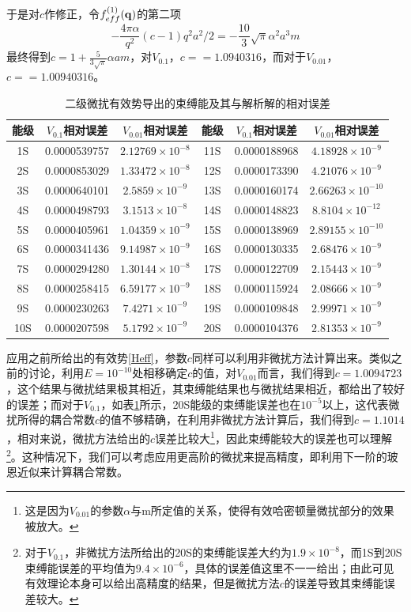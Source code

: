 \documentclass[cs4size,titlepage,twoside]{ctexart}
\begin{document}
于是对$c$作修正，令$f_{eff}^{(1)}(\vb{q})$的第二项
\begin{equation}
	-\frac{4\pi\alpha}{q^2}(c-1)q^2a^2/2=-\frac{10}{3} \sqrt{\pi } \alpha^2  a^3 m
\end{equation}
最终得到$\displaystyle c=1+\frac{5}{3\sqrt{\pi}}\alpha a m$，对$V_{0.1}$，$c==1.0940316$，而对于$V_{0.01}$，$c==1.00940316$。
\begin{table}[!htbp]
	\centering
	\begin{tabular}{|cccccc|}
		\hline
		能级 & $V_{0.1}$相对误差 & $V_{0.01}$相对误差 & 能级 & $V_{0.1}$相对误差 & $V_{0.01}$相对误差 \\\hline
		1S     & 0.0000539757 & $2.12769\times10^{-8}$ & 11S    & 0.0000188968 & $4.18928\times10^{-9}$  \\
		2S     & 0.0000853029 & $1.33472\times10^{-8}$ & 12S    & 0.0000173390 & $4.21076\times10^{-9}$  \\
		3S     & 0.0000640101 & $2.5859\times10^{-9}$  & 13S    & 0.0000160174 & $2.66263\times10^{-10}$ \\
		4S     & 0.0000498793 & $3.1513\times10^{-8}$  & 14S    & 0.0000148823 & $8.8104\times10^{-12}$  \\
		5S     & 0.0000405961 & $1.04359\times10^{-9}$ & 15S    & 0.0000138969 & $2.89155\times10^{-10}$ \\
		6S     & 0.0000341436 & $9.14987\times10^{-9}$ & 16S    & 0.0000130335 & $2.68476\times10^{-9}$  \\
		7S     & 0.0000294280 & $1.30144\times10^{-8}$ & 17S    & 0.0000122709 & $2.15443\times10^{-9}$  \\
		8S     & 0.0000258415 & $6.59177\times10^{-9}$ & 18S    & 0.0000115924 & $2.08666\times10^{-9}$  \\
		9S     & 0.0000230263 & $7.4271\times10^{-9}$  & 19S    & 0.0000109848 & $2.99971\times10^{-9}$  \\
		10S    & 0.0000207598 & $5.1792\times10^{-9}$  & 20S    & 0.0000104376 & $2.81353\times10^{-9}$  \\
		\hline
	\end{tabular}
	\caption{二级微扰有效势导出的束缚能及其与解析解的相对误差}\label{pertu2}
\end{table}

应用之前所给出的有效势\eqref{Heff}，参数$c$同样可以利用非微扰方法计算出来。类似之前的讨论，利用$E=10^{-10}$处相移确定$c$的值，对$V_{0.01}$而言，我们得到$c=1.0094723$，这个结果与微扰结果极其相近，其束缚能结果也与微扰结果相近，都给出了较好的误差；而对于$V_{0.1}$，如表\ref{pertu2}所示，20S能级的束缚能误差也在$10^{-5}$以上，这代表微扰所得的耦合常数$c$的值不够精确，在利用非微扰方法计算后，我们得到$c=1.1014$，相对来说，微扰方法给出的$c$误差比较大\footnote{这是因为$V_{0.01}$的参数$\alpha$与m所定值的关系，使得有效哈密顿量微扰部分的效果被放大。}，因此束缚能较大的误差也可以理解\footnote{对于$V_{0.1}$，非微扰方法所给出的20S的束缚能误差大约为$1.9\times10^{-8}$，而1S到20S束缚能误差的平均值为$9.4\times10^{-6}$，具体的误差值这里不一一给出；由此可见有效理论本身可以给出高精度的结果，但是微扰方法$c$的误差导致其束缚能误差较大。}。这种情况下，我们可以考虑应用更高阶的微扰来提高精度，即利用下一阶的玻恩近似来计算耦合常数。
\end{document}
